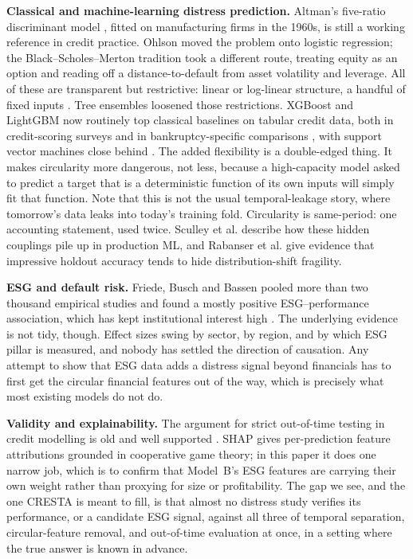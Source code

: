 \documentclass[conference]{IEEEtran}
\begin{document}
\textbf{Classical and machine-learning distress prediction.}
Altman's five-ratio discriminant model \cite{altman1968}, fitted on
manufacturing firms in the 1960s, is still a working reference in credit
practice. Ohlson \cite{ohlson1980} moved the problem onto logistic regression;
the Black--Scholes--Merton tradition \cite{merton1974} took a different route,
treating equity as an option and reading off a distance-to-default from asset
volatility and leverage. All of these are transparent but restrictive: linear or
log-linear structure, a handful of fixed inputs \cite{jones2015}. Tree ensembles
loosened those restrictions. XGBoost \cite{chen2016} and LightGBM \cite{ke2017}
now routinely top classical baselines on tabular credit data, both in
credit-scoring surveys \cite{lessmann2015} and in bankruptcy-specific
comparisons \cite{barboza2017}, with support vector machines close behind
\cite{bellotti2009}. The added flexibility is a double-edged thing. It makes
circularity more dangerous, not less, because a high-capacity model asked to
predict a target that is a deterministic function of its own inputs will simply
fit that function. Note that this is not the usual temporal-leakage story, where
tomorrow's data leaks into today's training fold. Circularity is same-period:
one accounting statement, used twice. Sculley et al. \cite{sculley2015} describe
how these hidden couplings pile up in production ML, and Rabanser et al.
\cite{rabanser2019} give evidence that impressive holdout accuracy tends to hide
distribution-shift fragility.

\textbf{ESG and default risk.}
Friede, Busch and Bassen \cite{friede2015} pooled more than two thousand
empirical studies and found a mostly positive ESG--performance association,
which has kept institutional interest high \cite{bassen2006}. The underlying
evidence is not tidy, though. Effect sizes swing by sector, by region, and by
which ESG pillar is measured, and nobody has settled the direction of
causation. Any attempt to show that ESG data adds a distress signal beyond
financials has to first get the circular financial features out of the way,
which is precisely what most existing models do not do.

\textbf{Validity and explainability.}
The argument for strict out-of-time testing in credit modelling is old and
well supported \cite{jones2015,lessmann2015}. SHAP \cite{lundberg2017} gives
per-prediction feature attributions grounded in cooperative game theory; in this
paper it does one narrow job, which is to confirm that Model~B's ESG features are
carrying their own weight rather than proxying for size or profitability. The
gap we see, and the one CRESTA is meant to fill, is that almost no distress study
verifies its performance, or a candidate ESG signal, against all three of
temporal separation, circular-feature removal, and out-of-time evaluation at
once, in a setting where the true answer is known in advance.
\end{document}
